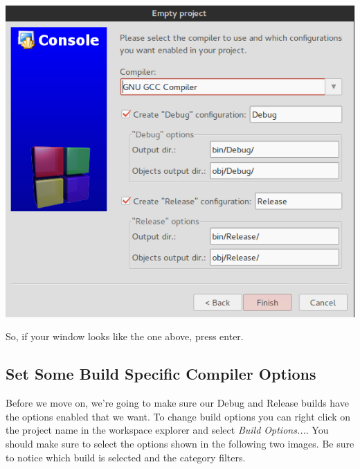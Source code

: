 \documentclass[10pt]{article}
\begin{document}
\vspace{.1in}
\begin{center}
\includegraphics[scale=.5]{CB_EmptyProjectBuilds.png}
\end{center}
\vspace{.1in}

So, if your window looks like the one above, press enter.

\subsection{Set Some Build Specific Compiler Options}

Before we move on, we're going to make sure our Debug and Release builds have the options enabled that we want. To change build options you can right click on the project name in the workspace explorer and select \textit{Build Options...}. You should make sure to select the options shown in the following two images. Be sure to notice which build is selected and the category filters.
\end{document}
